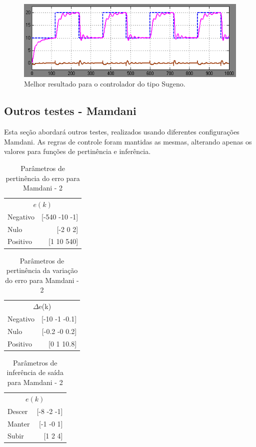 \documentclass[conference]{IEEEtran}
\begin{document}
\begin{figure}[!h]
    \centering
    \includegraphics[scale=0.2]{sugeno1.png}
    \caption { Melhor resultado para o controlador do tipo Sugeno. }
\end{figure}

\subsection{Outros testes - Mamdani}

Esta seção abordará outros testes, realizados usando diferentes configurações Mamdani. As regras de controle foram mantidas as mesmas, alterando apenas os valores para funções de pertinência e inferência.

\begin{table}[!h]
\caption{Parâmetros de pertinência do erro para Mamdani - 2}
\centering
\begin{tabular}{lr}
\toprule
\multicolumn{2}{c}{$e(k)$} \\
\cmidrule(r){1-2}
Negativo & [-540 -10 -1] \\
Nulo & [-2 0 2] \\
Positivo & [1 10 540] \\
\bottomrule
\end{tabular}
\end{table}

\begin{table}[!h]
\caption{Parâmetros de pertinência da variação do erro para Mamdani - 2}
\centering
\begin{tabular}{lr}
\toprule
\multicolumn{2}{c}{$\Delta$e(k)} \\
\cmidrule(r){1-2}
Negativo & [-10 -1 -0.1] \\
Nulo & [-0.2 -0 0.2] \\
Positivo & [0 1 10.8] \\
\bottomrule
\end{tabular}
\end{table}

\begin{table}[!h]
\caption{Parâmetros de inferência de saída para Mamdani - 2}
\centering
\begin{tabular}{lr}
\toprule
\multicolumn{2}{c}{$e(k)$} \\
\cmidrule(r){1-2}
Descer & [-8 -2 -1] \\
Manter & [-1 -0 1] \\
Subir & [1 2 4] \\
\bottomrule
\end{tabular}
\end{table}
\end{document}
